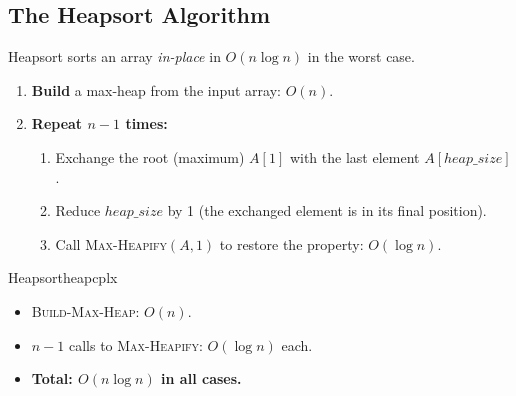 
\subsection{The Heapsort Algorithm}

Heapsort sorts an array \emph{in-place} in $O(n\log n)$ in the worst case.

\begin{enumerate}
  \item \textbf{Build} a max-heap from the input array: $O(n)$.
  \item \textbf{Repeat $n-1$ times:}
    \begin{enumerate}[label=\alph*.]
      \item Exchange the root (maximum) $A[1]$ with the last element $A[heap\_size]$.
      \item Reduce $heap\_size$ by 1 (the exchanged element is in its final position).
      \item Call \textsc{Max-Heapify}$(A, 1)$ to restore the property: $O(\log n)$.
    \end{enumerate}
\end{enumerate}

\begin{center}
\end{center}

\begin{complexity}{Heapsort}{heapcplx}
\begin{itemize}[noitemsep]
  \item \textsc{Build-Max-Heap}: $O(n)$.
  \item $n-1$ calls to \textsc{Max-Heapify}: $O(\log n)$ each.
  \item \textbf{Total: $O(n \log n)$ in all cases.}
\end{itemize}
\end{complexity}

